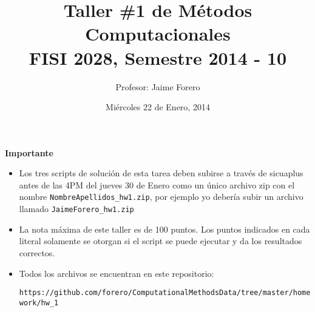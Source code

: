 \documentclass{article}
\title{Taller \#1 de M\'etodos Computacionales\\ FISI 2028, Semestre 2014 - 10}
\author{Profesor: Jaime Forero}
\date{Mi\'ercoles 22 de Enero, 2014}
\begin{document}
\maketitle
\thispagestyle{empty}


{\bf Importante}
\begin{itemize}

\item Los tres scripts de soluci\'on de esta tarea deben subirse a
  trav\'es de sicuaplus antes de las 4PM del jueves 30 de Enero como
  un \'unico archivo zip con el nombre
  \verb"NombreApellidos_hw1.zip", por ejemplo yo deber\'ia subir un
  archivo llamado \verb"JaimeForero_hw1.zip"

\item La nota m\'axima de este taller es de 100 puntos. Los puntos indicados
en cada literal solamente se otorgan si el script se puede ejecutar y
da los resultados correctos.  

\item Todos los archivos se encuentran en este repositorio:

  \verb"https://github.com/forero/ComputationalMethodsData/tree/master/homework/hw_1"
\end{itemize}
\end{document}

